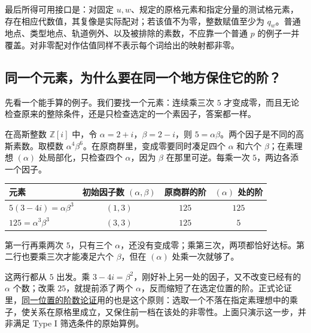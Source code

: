 最后所得可用接口是：对固定 $u,w$、规定的原格元素和指定分量的测试格元素，存在相应代数值，其复像是实际配对；若该值不为零，整数赋值至少为 $q_w$。普通地点、类型地点、轨道例外、以及被排除的素数，不应靠一个普通 $p$ 的例子一并覆盖。对非零配对作估值同样不表示每个词给出的映射都非零。

\subsection{同一个元素，为什么要在同一个地方保住它的阶？}
\label{sec:same-place-order-zh}

先看一个能手算的例子。我们要找一个元素：连续乘三次 $5$ 才变成零，而且无论检查原来的整除条件，还是只检查选定的一个素因子，答案都一样。

在高斯整数 $\mathbb Z[i]$ 中，令 $\alpha=2+i$，$\beta=2-i$，则 $5=\alpha\beta$。两个因子是不同的高斯素数。取模数 $\alpha^4\beta^6$。在原商群里，变成零要同时凑足四个 $\alpha$ 和六个 $\beta$；在素理想 $(\alpha)$ 处局部化，只检查四个 $\alpha$，因为 $\beta$ 在那里可逆。每乘一次 $5$，两边各添一个因子。

\begin{center}
\begin{tabular}{@{}lccc@{}}
\toprule
元素 & 初始因子数 $(\alpha,\beta)$ & 原商群的阶 & $(\alpha)$ 处的阶\\
\midrule
$5(3-4i)=\alpha\beta^3$ & $(1,3)$ & $125$ & $125$\\
$125=\alpha^3\beta^3$ & $(3,3)$ & $125$ & $5$\\
\bottomrule
\end{tabular}
\end{center}

第一行再乘两次 $5$，只有三个 $\alpha$，还没有变成零；乘第三次，两项都恰好达标。第二行也要乘三次才能凑足六个 $\beta$，但在 $(\alpha)$ 处乘一次就够了。

这两行都从 $5$ 出发。乘 $3-4i=\beta^2$，刚好补上另一处的因子，又不改变已经有的 $\alpha$ 个数；改乘 $25$，就提前添了两个 $\alpha$，反而缩短了在选定位置的阶。正式论证里，\href{https://github.com/CheyLoveday/RH-public/blob/1c1fbd7556931388818472fb812bc3161ab12fc7/papers/type-i-torsion/lean/src/Formalism/LocalToGlobal/GlobalTheory/GL6/DiagonalSlopes/TypeISamePlaceOrder.lean\#L72-L145}{同一位置的阶数论证}用的也是这个原则：选取一个不落在指定素理想中的乘子，使关系在原格里成立，又保住前一档在该处的非零性。上面只演示这一步，并非满足 Type I 筛选条件的原始算例。

